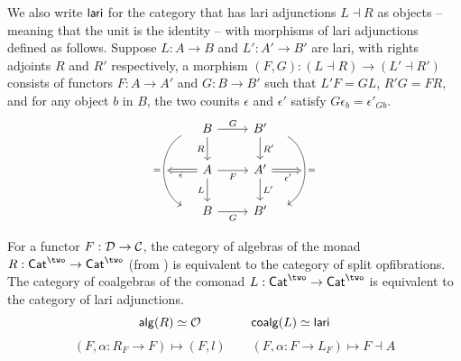 We also write $\mathsf{lari}$ for the category that has lari adjunctions $L \dashv R$
as objects -- meaning that the unit is the identity --
with morphisms of lari adjunctions defined as follows.
Suppose $L : A \to B$ and $L' : A' \to B'$ are lari,
with rights adjoints $R$ and $R'$ respectively,
a morphism $(F,G) : (L \dashv R) \to (L' \dashv R')$
consists of functors $F : A \to A'$ and $G : B \to B'$
such that $L' F = G L$, $R' G = F R$,
and for any object $b$ in $B$,
the two counits $\epsilon$ and $\epsilon'$ satisfy
$G \epsilon_b = \epsilon'_{G b}$.
\[
  \begin{tikzcd}
	B & {B'} \\
	A & {A'} \\
	B & {B'}
	\arrow["G", from=1-1, to=1-2]
	\arrow["R"', from=1-1, to=2-1]
	\arrow[""{name=0, anchor=center, inner sep=0}, "{=}"', shift right = 5, bend right = 60, from=1-1, to=3-1]
	\arrow["{R'}", from=1-2, to=2-2]
	\arrow[""{name=1, anchor=center, inner sep=0}, "{=}", shift left = 5, bend left = 60, from=1-2, to=3-2]
	\arrow["F"', from=2-1, to=2-2]
	\arrow["L"', from=2-1, to=3-1]
	\arrow["{L'}", from=2-2, to=3-2]
	\arrow["G"', from=3-1, to=3-2]
	\arrow["\epsilon", Rightarrow, from=2-1, to=0, shorten >=0.5ex]
	\arrow["{\epsilon'}"', Rightarrow, from=2-2, to=1, shorten >=0.5ex]
\end{tikzcd}
\]

\begin{theorem}
  For a functor $F : \mathcal{D} \to \mathcal{C}$,
  the category of algebras of the monad $R : \Cat^\two \to \Cat^\two$
  (from )
  is equivalent to the category of split opfibrations.
  The category of coalgebras of the comonad $L : \Cat^\two \to \Cat^\two$
  is equivalent to the category of lari adjunctions.
  \[ \mathsf{alg}(R) \simeq {\mathcal{O}}
  \quad \quad \quad \quad
  \mathsf{coalg}(L) \simeq \mathsf{lari}\]
  \[
  (F, \alpha : R_F \to F) \mapsto (F,l)
  \quad \quad
  (F, \alpha : F \to L_F) \mapsto F \dashv A
  \]

\end{theorem}



